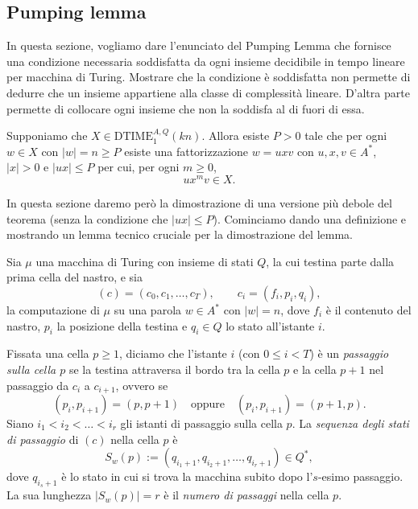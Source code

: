 \subsection{Pumping lemma}
In questa sezione, vogliamo dare l'enunciato del Pumping Lemma che fornisce una condizione necessaria soddisfatta da ogni insieme decidibile in tempo lineare per macchina di Turing. Mostrare che la condizione è soddisfatta non permette di dedurre che un insieme appartiene alla classe di complessità lineare. D'altra parte permette di collocare ogni insieme che non la soddisfa al di fuori di essa.
\begin{lemm}\label{lemm:pumping forte}
Supponiamo che $X \in \text{DTIME}^{A,Q}_1(kn)$. Allora esiste $P > 0$ tale che per ogni $w \in X$ con $|w| = n \ge P$ esiste una fattorizzazione $w = uxv$ con $u, x, v \in A^*$, $|x| > 0$ e $|ux| \le P$ per cui, per ogni $m \ge 0$,
\[
u x^m v \in X.
\]
\end{lemm}
In questa sezione daremo però la dimostrazione di una versione
più debole del teorema (senza la condizione che $|ux|\leq P$).
Cominciamo dando una definizione e mostrando un lemma
tecnico cruciale per la dimostrazione
del lemma.
\begin{defi}\label{defi:sequenza-passaggio}
Sia $\mu$ una macchina di Turing con insieme di stati $Q$, la cui testina parte dalla prima cella del nastro, e sia
\[
(c) = (c_0, c_1, \dots, c_T), \qquad c_i = (f_i, p_i, q_i),
\]
la computazione di $\mu$ su una parola $w \in A^*$ con $|w| = n$, dove $f_i$ è il contenuto del nastro, $p_i$ la posizione della testina e $q_i \in Q$ lo stato all'istante $i$.

Fissata una cella $p \ge 1$, diciamo che l'istante $i$ (con $0 \le i < T$) è un \emph{passaggio sulla cella $p$} se la testina attraversa il bordo tra la cella $p$ e la cella $p+1$ nel passaggio da $c_i$ a $c_{i+1}$, ovvero se
\[
(p_i, p_{i+1}) = (p, p+1) \quad \text{oppure} \quad (p_i, p_{i+1}) = (p+1, p).
\]
Siano $i_1 < i_2 < \dots < i_r$ gli istanti di passaggio sulla cella $p$. La \emph{sequenza degli stati di passaggio} di $(c)$ nella cella $p$ è
\[
S_w(p) := (q_{i_1+1}, q_{i_2+1}, \dots, q_{i_r+1}) \in Q^*,
\]
dove $q_{i_s+1}$ è lo stato in cui si trova la macchina subito dopo l'$s$-esimo passaggio. La sua lunghezza $|S_w(p)| = r$ è il \emph{numero di passaggi} nella cella $p$.
\end{defi}

